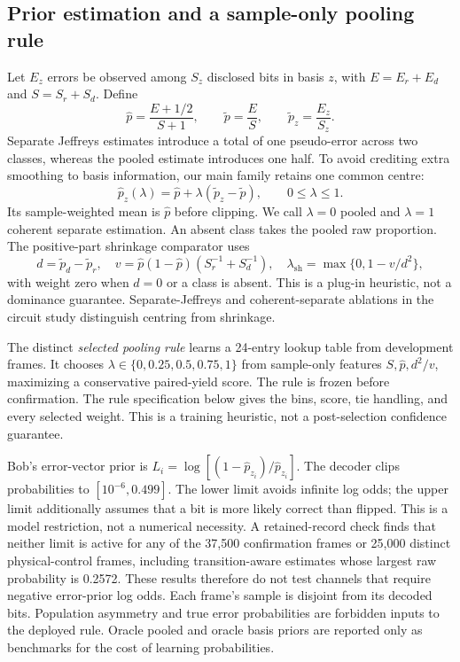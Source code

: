 \subsection{Prior estimation and a sample-only pooling rule}
\label{app:reconmethods}
\label{sec:methods}
Let $E_z$ errors be observed among $S_z$ disclosed bits in basis $z$, with
$E=E_r+E_d$ and $S=S_r+S_d$. Define
\begin{equation}
 \widehat p=\frac{E+1/2}{S+1},\qquad
 \widetilde p=\frac ES,\qquad
 \widetilde p_z=\frac{E_z}{S_z}.
 \label{eq:pool}
\end{equation}
Separate Jeffreys estimates introduce a total of one pseudo-error across two classes,
whereas the pooled estimate introduces one half. To avoid crediting extra smoothing to
basis information, our main family retains one common centre:
\begin{equation}
 \widehat p_z(\lambda)=\widehat p+\lambda(\widetilde p_z-\widetilde p),
 \qquad 0\leq\lambda\leq1.
 \label{eq:shrink}
\end{equation}
Its sample-weighted mean is $\widehat p$ before clipping. We call $\lambda=0$ pooled
and $\lambda=1$ coherent separate estimation. An absent class takes the pooled raw
proportion. The positive-part shrinkage comparator uses
\begin{equation}
 d=\widetilde p_d-\widetilde p_r,\quad
 v=\widehat p(1-\widehat p)(S_r^{-1}+S_d^{-1}),\quad
 \lambda_{\mathrm{sh}}=\max\{0,1-v/d^2\},
 \label{eq:weight}
\end{equation}
with weight zero when $d=0$ or a class is absent. This is a plug-in heuristic, not a
dominance guarantee. Separate-Jeffreys and coherent-separate ablations in the circuit
study distinguish centring from shrinkage.

The distinct \emph{selected pooling rule} learns a 24-entry lookup table
from development frames. It chooses $\lambda\in\{0,0.25,0.5,0.75,1\}$ from
sample-only features $S,\widehat p,d^2/v$, maximizing a conservative paired-yield
score. The rule is frozen before confirmation. The rule specification below gives
the bins, score, tie handling, and every selected weight. This is a training
heuristic, not a post-selection confidence guarantee.

Bob's error-vector prior is $L_i=\log[(1-\widehat p_{z_i})/\widehat p_{z_i}]$.
The decoder clips probabilities to $[10^{-6},0.499]$. The lower limit avoids infinite
log odds; the upper limit additionally assumes that a bit is more likely correct
than flipped. This is a model restriction, not a numerical necessity. A retained-record
check finds that neither limit is active for any of the 37,500 confirmation frames
or 25,000 distinct physical-control frames, including transition-aware estimates
whose largest raw probability is 0.2572. These results therefore do not test channels
that require negative error-prior log odds. Each frame's sample is disjoint from its decoded bits. Population asymmetry and true error
probabilities are forbidden inputs to the deployed rule. Oracle pooled and oracle
basis priors are reported only as benchmarks for the cost of learning probabilities.

